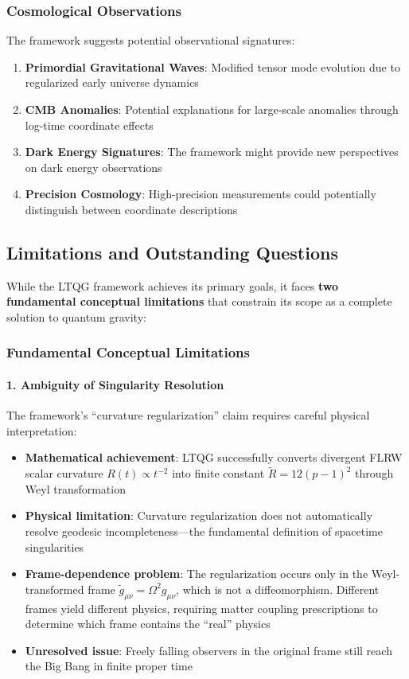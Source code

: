 \subsubsection{Cosmological Observations}

The framework suggests potential observational signatures:

\begin{enumerate}
\item \textbf{Primordial Gravitational Waves}: Modified tensor mode evolution due to regularized early universe dynamics
\item \textbf{CMB Anomalies}: Potential explanations for large-scale anomalies through log-time coordinate effects
\item \textbf{Dark Energy Signatures}: The framework might provide new perspectives on dark energy observations
\item \textbf{Precision Cosmology}: High-precision measurements could potentially distinguish between coordinate descriptions
\end{enumerate}

\subsection{Limitations and Outstanding Questions}
\label{subsec:limitations_questions}

While the LTQG framework achieves its primary goals, it faces \textbf{two fundamental conceptual limitations} that constrain its scope as a complete solution to quantum gravity:

\subsubsection{Fundamental Conceptual Limitations}

\paragraph{1. Ambiguity of Singularity Resolution}
The framework's ``curvature regularization'' claim requires careful physical interpretation:

\begin{itemize}
\item \textbf{Mathematical achievement}: LTQG successfully converts divergent FLRW scalar curvature $R(t) \propto t^{-2}$ into finite constant $\tilde{R} = 12(p-1)^2$ through Weyl transformation
\item \textbf{Physical limitation}: Curvature regularization does not automatically resolve geodesic incompleteness—the fundamental definition of spacetime singularities
\item \textbf{Frame-dependence problem}: The regularization occurs only in the Weyl-transformed frame $\tilde{g}_{\mu\nu} = \Omega^2 g_{\mu\nu}$, which is not a diffeomorphism. Different frames yield different physics, requiring matter coupling prescriptions to determine which frame contains the ``real'' physics
\item \textbf{Unresolved issue}: Freely falling observers in the original frame still reach the Big Bang in finite proper time
\end{itemize}

